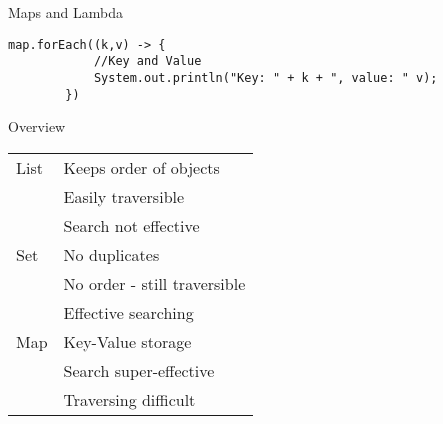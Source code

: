 \begin{frame}[fragile]{Maps and Lambda}
	\begin{lstlisting}[basicstyle=\ttfamily\scriptsize]
		map.forEach((k,v) -> {
			//Key and Value
			System.out.println("Key: " + k + ", value: " v);
		})
	\end{lstlisting}
\end{frame}

\begin{frame}{Overview}
	\begin{center}
		\begin{tabular}{ l | l }
			List & Keeps order of objects \\
				 & Easily traversible \\
				 & Search not effective \\
			\hline
			Set  & No duplicates \\
				 & No order - still traversible \\
				 & Effective searching \\
			\hline
			Map  & Key-Value storage \\
				 & Search super-effective \\
				 & Traversing difficult
			
		\end{tabular}
	\end{center}
\end{frame}

